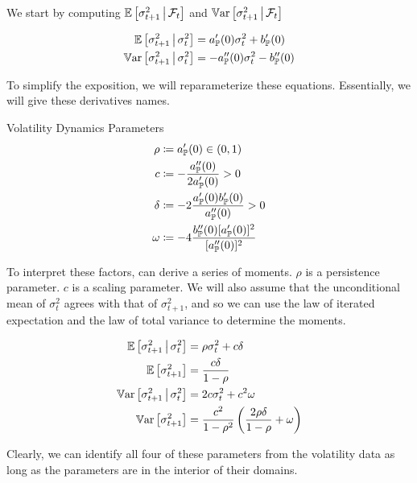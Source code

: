 \documentclass[11pt, letterpaper, twoside, final]{article}
\begin{document}
We start by computing $\operatorname{\mathbb{E}}\left[\sigma^2_{t+1} \,\middle\vert\, \mathcal{F}_t\right]$ and $\operatorname{\mathbb{V}ar}\left[\sigma^2_{t+1} \,\middle\vert\,
\mathcal{F}_t\right]$


\begin{align}
    \operatorname{\mathbb{E}}\left[\sigma^2_{t+1} \,\middle\vert\, \sigma^2_t \right]  &= a_{\mathbb{P}}'(0) \sigma^2_t  + b_{\mathbb{P}}'(0) \\
    \operatorname{\mathbb{V}ar}\left[\sigma^2_{t+1} \,\middle\vert\, \sigma^2_t \right]  &= -a_{\mathbb{P}}''(0) \sigma^2_t  - b_{\mathbb{P}}''(0) 
\end{align}

To simplify the exposition, we will reparameterize these equations. 
Essentially, we will give these derivatives names.

\begin{defn}{Volatility Dynamics Parameters}
    \label{defn:vol_dynamics_params}
    \begin{align}
        \rho &\coloneqq a_{\mathbb{P}}'(0) \in (0,1) \\
        c &\coloneqq - \frac{a_{\mathbb{P}}''(0)}{2 a_{\mathbb{P}}'(0)} > 0 \\
        \delta &\coloneqq -2 \frac{a_{\mathbb{P}}'(0) b_{\mathbb{P}}'(0)}{a_{\mathbb{P}}''(0)} > 0 \\
        \omega &\coloneqq -4 \frac{b_{\mathbb{P}}''(0) [a_{\mathbb{P}}'(0)]^2}{[a_{\mathbb{P}}''(0)]^2}
    \end{align}
\end{defn}

To interpret these factors, can derive a series of moments. 
$\rho$ is a persistence parameter.
$c$ is a scaling parameter.
We will also assume that the unconditional mean of $\sigma^2_t$ agrees with that of $\sigma^2_{t+1}$, and so we can use
the law of iterated expectation and the law of total variance to determine the moments.


\begin{align}
    \E\left[\sigma^2_{t+1} \mvert \sigma^2_t \right]  &= \rho \sigma^2_t  + c \delta\\
%
    \E\left[\sigma^2_{t+1}\right]  &= \frac{c \delta}{1 - \rho} \\
%
    \Var\left[\sigma^2_{t+1} \mvert \sigma^2_t \right]  &=  2 c \sigma^2_t  + c^2 \omega \\
%
    \Var\left[\sigma^2_{t+1} \right]  &=  \frac{c^2}{1- \rho^2} \left(\frac{2 \rho \delta}{1 - \rho}  + \omega
        \right) 
\end{align}

Clearly, we can identify all four of these parameters from the volatility data as long as the parameters are in
the interior of their domains.
\end{document}

